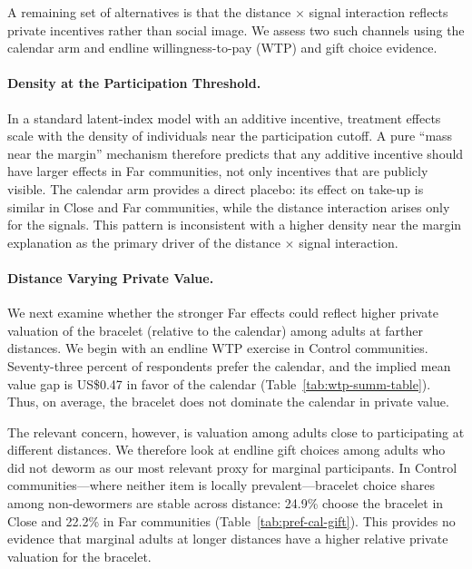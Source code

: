 \documentclass[12pt,a4paper]{article}
\begin{document}
A remaining set of alternatives is that the distance $\times$ signal interaction reflects private incentives rather than social image. We assess two such channels using the calendar arm and endline willingness-to-pay (WTP) and gift choice evidence. 

\paragraph{Density at the Participation Threshold.} In a standard latent-index model with an additive incentive, treatment effects scale with the density of individuals near the participation cutoff. A pure ``mass near the margin'' mechanism therefore predicts that any additive incentive should have larger effects in Far communities, not only incentives that are publicly visible. The calendar arm provides a direct placebo: its effect on take-up is similar in Close and Far communities, while the distance interaction arises only for the signals. This pattern is inconsistent with a higher density near the margin explanation as the primary driver of the distance $\times$ signal interaction.

\paragraph{Distance Varying Private Value.} We next examine whether the stronger Far effects could reflect higher private valuation of the bracelet (relative to the calendar) among adults at farther distances. We begin with an endline WTP exercise in Control communities. Seventy-three percent of respondents prefer the calendar, and the implied mean value gap is US\$0.47 in favor of the calendar (Table~\ref{tab:wtp-summ-table}). Thus, on average, the bracelet does not dominate the calendar in private value. 

The relevant concern, however, is valuation among adults close to participating at different distances. We therefore look at endline gift choices among adults who did not deworm as our most relevant proxy for marginal participants. In Control communities---where neither item is locally prevalent---bracelet choice shares among non-dewormers are stable across distance: 24.9\% choose the bracelet in Close and 22.2\% in Far communities (Table~\ref{tab:pref-cal-gift}). This provides no evidence that marginal adults at longer distances have a higher relative private valuation for the bracelet. 
\end{document}
